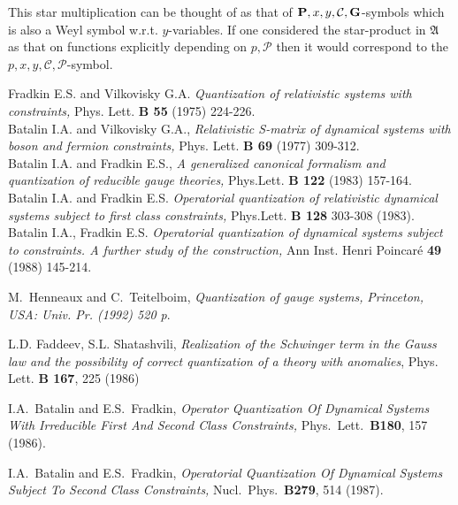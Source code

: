 \documentclass[a4paper,11pt,oneside]{amsart}
\theoremstyle{plain}
\numberwithin{equation}{section} %
\numberwithin{figure}{section} %
\def\cP{{\mathcal P}}
\def\cc{{\mathcal C}}
\def\aA{{ \mathfrak A}}
\def\P{{ \bf P}}
\def\G{{ \bf G}}
\begin{document}
\noindent
This star multiplication can be thought of
as that of $\P,x,y,\cc,\G$-symbols
which is also a Weyl symbol w.r.t. $y$-variables.  If
one considered the star-product in $\aA$ as
that on functions explicitly depending on $p,\cP$
then it would correspond to the $p,x,y,\cc,\cP$-symbol.

\begin{thebibliography}{33}

\bibitem{[BFV]}
         Fradkin E.S. and Vilkovisky G.A. {\em Quantization
         of relativistic systems with
         constraints,}  Phys. Lett. {\bf B 55} (1975) 224-226.  \\
         Batalin I.A. and  Vilkovisky G.A.,
         {\em Relativistic S-matrix of dynamical systems with boson
         and fermion constraints,}
         Phys. Lett. {\bf B 69} (1977) 309-312.          \\
         Batalin I.A. and Fradkin E.S.,
                                 {\em  A generalized canonical formalism and quantization of
         reducible gauge theories,}
           Phys.Lett. {\bf B 122 }     (1983) 157-164.   \\
         Batalin I.A. and Fradkin E.S.
         {\em Operatorial quantization of relativistic dynamical systems
         subject to first class constraints,}
         Phys.Lett. {\bf B 128} 303-308 (1983).             \\
         Batalin I.A., Fradkin E.S.
         {\em Operatorial quantization of dynamical systems subject to
         constraints. A further study of the construction,}
         Ann Inst. Henri Poincar\'e  {\bf 49} (1988) 145-214.


\bibitem{[HT]} M.~Henneaux and C.~Teitelboim,
{\em Quantization of gauge systems,}
{\it  Princeton, USA: Univ. Pr. (1992) 520 p}.




\bibitem{[FSh]} L.D. Faddeev, S.L. Shatashvili, {\em Realization of the
Schwinger term in the Gauss law and the possibility of
correct quantization of a theory with anomalies},
 Phys. Lett. {\bf B 167}, 225 (1986)

\bibitem{[BF]} I.A.~Batalin and E.S.~Fradkin,
{\em Operator Quantization Of Dynamical Systems With Irreducible
First And Second Class Constraints,} Phys.\ Lett.\ {\bf B180}, 157 (1986).

\bibitem{[BF87]} I.A.~Batalin and E.S.~Fradkin, {\em
Operatorial Quantization Of Dynamical Systems Subject To Second Class
Constraints,} Nucl.\ Phys.\ {\bf B279}, 514 (1987).


\end{thebibliography}
\end{document}
